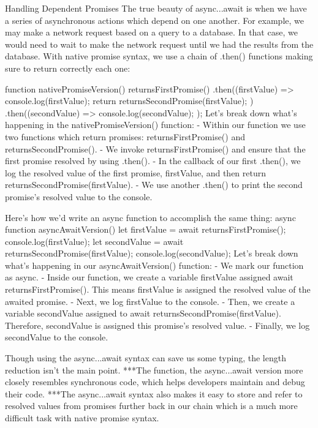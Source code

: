 Handling Dependent Promises
    The true beauty of async...await is when we have a series of asynchronous actions which depend on one another. For example, we may make a network request based on a query to a database. In that case, we would need to wait to make the network request until we had the results from the database. With native promise syntax, we use a chain of .then() functions making sure to return correctly each one:

        function nativePromiseVersion() {
            returnsFirstPromise()
            .then((firstValue) => {
                console.log(firstValue);
                return returnsSecondPromise(firstValue);
            })
        .then((secondValue) => {
                console.log(secondValue);
            });
        }
    Let’s break down what’s happening in the nativePromiseVersion() function:
        - Within our function we use two functions which return promises: returnsFirstPromise() and returnsSecondPromise().
        - We invoke returnsFirstPromise() and ensure that the first promise resolved by using .then().
        - In the callback of our first .then(), we log the resolved value of the first promise, firstValue, and then return returnsSecondPromise(firstValue).
        - We use another .then() to print the second promise’s resolved value to the console.
    
    Here’s how we’d write an async function to accomplish the same thing:
        async function asyncAwaitVersion() {
        let firstValue = await returnsFirstPromise();
        console.log(firstValue);
        let secondValue = await returnsSecondPromise(firstValue);
        console.log(secondValue);
        }
    Let’s break down what’s happening in our asyncAwaitVersion() function:
        - We mark our function as async.
        - Inside our function, we create a variable firstValue assigned await returnsFirstPromise(). This means firstValue is assigned the resolved value of the awaited promise.
        - Next, we log firstValue to the console.
        - Then, we create a variable secondValue assigned to await returnsSecondPromise(firstValue). Therefore, secondValue is assigned this promise’s resolved value.
        - Finally, we log secondValue to the console.

    Though using the async...await syntax can save us some typing, the length reduction isn’t the main point.
    ***The function, the async...await version more closely resembles synchronous code, which helps developers maintain and debug their code.
    ***The async...await syntax also makes it easy to store and refer to resolved values from promises further back in our chain which is a much more difficult task with native promise syntax.